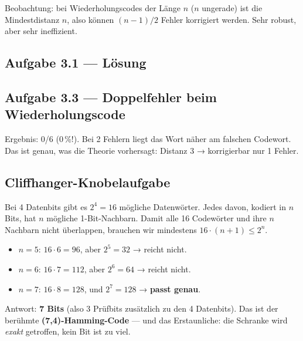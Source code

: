 Beobachtung: bei Wiederholungscodes der Länge $n$ ($n$ ungerade) ist
die Mindestdistanz $n$, also können $(n-1)/2$ Fehler korrigiert
werden. Sehr robust, aber sehr ineffizient.

\subsection*{Aufgabe 3.1 — Lösung}


\subsection*{Aufgabe 3.3 — Doppelfehler beim Wiederholungscode}


Ergebnis: 0/6 (0\,\%!). Bei 2 Fehlern liegt das Wort näher am falschen
Codewort. Das ist genau, was die Theorie vorhersagt: Distanz 3 →
korrigierbar nur 1 Fehler.

\subsection*{Cliffhanger-Knobelaufgabe}

Bei 4 Datenbits gibt es $2^4 = 16$ mögliche Datenwörter. Jedes davon,
kodiert in $n$ Bits, hat $n$ mögliche 1-Bit-Nachbarn. Damit alle 16
Codewörter und ihre $n$ Nachbarn nicht überlappen, brauchen wir
mindestens $16 \cdot (n+1) \le 2^n$.

\begin{itemize}
\item $n = 5$: $16 \cdot 6 = 96$, aber $2^5 = 32$ → reicht nicht.
\item $n = 6$: $16 \cdot 7 = 112$, aber $2^6 = 64$ → reicht nicht.
\item $n = 7$: $16 \cdot 8 = 128$, und $2^7 = 128$ → \textbf{passt
  genau}.
\end{itemize}

Antwort: \textbf{7 Bits} (also 3 Prüfbits zusätzlich zu den 4
Datenbits). Das ist der berühmte \textbf{(7,4)-Hamming-Code} — und das
Erstaunliche: die Schranke wird \emph{exakt} getroffen, kein Bit ist
zu viel.
